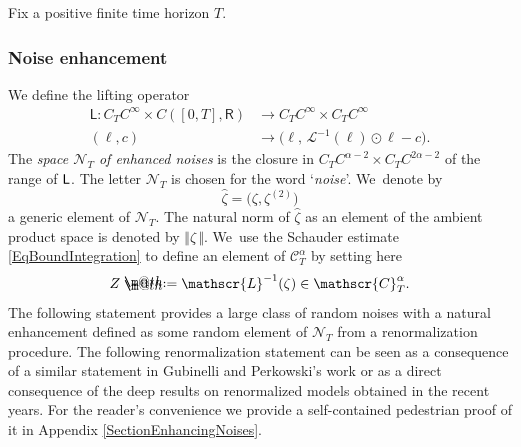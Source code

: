 \documentclass[JEP,XML,SOM,Unicode,published]{cedram}
\makeatletter
\theoremstyle{definition}
\newcommand\bbR{\mathbf{\mathsf{R}}}
\newcommand{\mcN}{\mathcal{N}}
\newcommand*{\defeq}{\mathrel{\rlap{%
\raisebox{0.3ex}{$\m@th\cdot$}}%
\raisebox{-0.3ex}{$\m@th\cdot$}}%
=}
\newcommand{\scrL}{\mathscr{L}}
\makeatother
\begin{document}
Fix a positive finite time horizon $T$.

\subsubsection{Noise enhancement} We define the lifting operator
\begin{equation*} \begin{split}
\mathsf{L} : C_TC^\infty\times C([0,T],\bbR) &\to C_TC^\infty\times C_TC^\infty \\
(\ell, c) &\to \bigl(\ell, \, \scrL^{-1}(\ell)\odot\ell - c\bigr).
\end{split} \end{equation*}
The \emph{space ${{\boldsymbol{\mcN}}_T}$ of enhanced noises} is the closure in $C_TC^{\alpha-2}\times C_TC^{2\alpha-2}$ of the range of $\sf L$. The letter ${{\boldsymbol{\mcN}}_T}$ is chosen for the word `\emph{noise}'. We~denote by
\[
\widehat\zeta = \bigl(\zeta,\zeta^{(2)}\bigr)
\]
a generic element of ${{\boldsymbol{\mcN}}_T}$. The natural norm of $\widehat\zeta$ as an element of the ambient product space is denoted by $\Vert\widehat\zeta\,\Vert$. We~use the Schauder estimate \eqref{EqBoundIntegration} to define an element of $\mathscr{C}^\alpha_T$ by setting here
\[
Z \defeq \scrL^{-1}(\zeta) \in \mathscr{C}^\alpha_T.
\]
The following statement provides a large class of random noises with a natural enhancement defined as some random element of ${{\boldsymbol{\mcN}}_T}$ from a renormalization procedure. The following renormalization statement can be seen as a consequence of a similar statement in Gubinelli and Perkowski's work \cite{KPZreloaded} or as a direct consequence of the deep results on renormalized models obtained in the recent years. For the reader's convenience we provide a self-contained pedestrian proof of it in Appendix \ref{SectionEnhancingNoises}.
\end{document}

